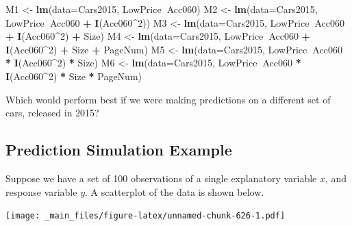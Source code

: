 \documentclass[]{book}
\newenvironment{Shaded}{\begin{snugshade}}{\end{snugshade}}
\newcommand{\KeywordTok}[1]{\textcolor[rgb]{0.13,0.29,0.53}{\textbf{#1}}}
\newcommand{\DataTypeTok}[1]{\textcolor[rgb]{0.13,0.29,0.53}{#1}}
\newcommand{\DecValTok}[1]{\textcolor[rgb]{0.00,0.00,0.81}{#1}}
\newcommand{\StringTok}[1]{\textcolor[rgb]{0.31,0.60,0.02}{#1}}
\newcommand{\OperatorTok}[1]{\textcolor[rgb]{0.81,0.36,0.00}{\textbf{#1}}}
\newcommand{\NormalTok}[1]{#1}
\begin{document}
\begin{Shaded}
\begin{Highlighting}[]
\NormalTok{M1 <-}\StringTok{ }\KeywordTok{lm}\NormalTok{(}\DataTypeTok{data=}\NormalTok{Cars2015, LowPrice}\OperatorTok{~}\NormalTok{Acc060)}
\NormalTok{M2 <-}\StringTok{ }\KeywordTok{lm}\NormalTok{(}\DataTypeTok{data=}\NormalTok{Cars2015, LowPrice}\OperatorTok{~}\NormalTok{Acc060 }\OperatorTok{+}\StringTok{ }\KeywordTok{I}\NormalTok{(Acc060}\OperatorTok{^}\DecValTok{2}\NormalTok{))}
\NormalTok{M3 <-}\StringTok{ }\KeywordTok{lm}\NormalTok{(}\DataTypeTok{data=}\NormalTok{Cars2015, LowPrice}\OperatorTok{~}\NormalTok{Acc060 }\OperatorTok{+}\StringTok{ }\KeywordTok{I}\NormalTok{(Acc060}\OperatorTok{^}\DecValTok{2}\NormalTok{) }\OperatorTok{+}\StringTok{ }\NormalTok{Size)}
\NormalTok{M4 <-}\StringTok{ }\KeywordTok{lm}\NormalTok{(}\DataTypeTok{data=}\NormalTok{Cars2015, LowPrice}\OperatorTok{~}\NormalTok{Acc060 }\OperatorTok{+}\StringTok{ }\KeywordTok{I}\NormalTok{(Acc060}\OperatorTok{^}\DecValTok{2}\NormalTok{) }\OperatorTok{+}\StringTok{ }\NormalTok{Size }\OperatorTok{+}\StringTok{ }\NormalTok{PageNum)}
\NormalTok{M5 <-}\StringTok{ }\KeywordTok{lm}\NormalTok{(}\DataTypeTok{data=}\NormalTok{Cars2015, LowPrice}\OperatorTok{~}\NormalTok{Acc060 }\OperatorTok{*}\StringTok{ }\KeywordTok{I}\NormalTok{(Acc060}\OperatorTok{^}\DecValTok{2}\NormalTok{) }\OperatorTok{*}\StringTok{ }\NormalTok{Size)}
\NormalTok{M6 <-}\StringTok{ }\KeywordTok{lm}\NormalTok{(}\DataTypeTok{data=}\NormalTok{Cars2015, LowPrice}\OperatorTok{~}\NormalTok{Acc060 }\OperatorTok{*}\StringTok{ }\KeywordTok{I}\NormalTok{(Acc060}\OperatorTok{^}\DecValTok{2}\NormalTok{) }\OperatorTok{*}\StringTok{ }\NormalTok{Size }\OperatorTok{*}\StringTok{ }\NormalTok{PageNum)}
\end{Highlighting}
\end{Shaded}

Which would perform best if we were making predictions on a different
set of cars, released in 2015?

\subsection{Prediction Simulation
Example}\label{prediction-simulation-example}

Suppose we have a set of 100 observations of a single explanatory
variable \(x\), and response variable \(y\). A scatterplot of the data
is shown below.

\texttt{[image: \_main\_files/figure-latex/unnamed-chunk-626-1.pdf]}
\end{document}
